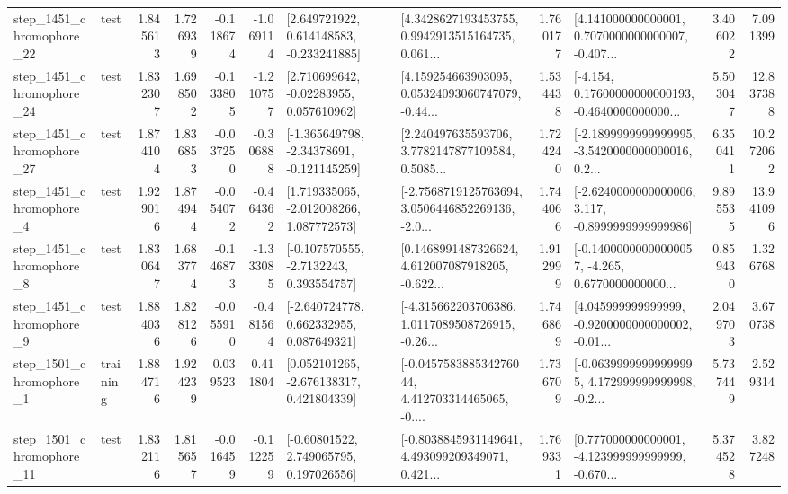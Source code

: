 \begin{tabular}{llrrrrllrlrr}
 step\_1451\_chromophore\_22 &      test &      1.845613 &    1.726939 &     -0.118674 & -1.069114 &    [2.649721922, 0.614148583, -0.233241885] &  [4.3428627193453755, 0.9942913515164735, 0.061... &       1.760177 &  [4.141000000000001, 0.7070000000000007, -0.407... &            3.406022 &          7.091399 \\
 step\_1451\_chromophore\_24 &      test &      1.832307 &    1.698502 &     -0.133805 & -1.210757 &     [2.710699642, -0.02283955, 0.057610962] &  [4.159254663903095, 0.05324093060747079, -0.44... &       1.534438 &  [-4.154, 0.17600000000000193, -0.4640000000000... &            5.503047 &         12.837388 \\
 step\_1451\_chromophore\_27 &      test &      1.874104 &    1.836853 &     -0.037250 & -0.306888 &   [-1.365649798, -2.34378691, -0.121145259] &  [2.240497635593706, 3.7782147877109584, 0.5085... &       1.724240 &  [-2.1899999999999995, -3.5420000000000016, 0.2... &            6.350411 &         10.272062 \\
  step\_1451\_chromophore\_4 &      test &      1.929016 &    1.874944 &     -0.054072 & -0.464362 &    [1.719335065, -2.012008266, 1.087772573] &  [-2.7568719125763694, 3.0506446852269136, -2.0... &       1.744066 &  [-2.6240000000000006, 3.117, -0.8999999999999986] &            9.895535 &         13.941096 \\
  step\_1451\_chromophore\_8 &      test &      1.830647 &    1.683774 &     -0.146873 & -1.333085 &     [-0.107570555, -2.7132243, 0.393554757] &  [0.1468991487326624, 4.612007087918205, -0.622... &       1.912999 &  [-0.14000000000000057, -4.265, 0.6770000000000... &            0.859430 &          1.326768 \\
  step\_1451\_chromophore\_9 &      test &      1.884036 &    1.828126 &     -0.055910 & -0.481564 &    [-2.640724778, 0.662332955, 0.087649321] &  [-4.315662203706386, 1.0117089508726915, -0.26... &       1.746869 &  [4.045999999999999, -0.9200000000000002, -0.01... &            2.049703 &          3.670738 \\
  step\_1501\_chromophore\_1 &  training &      1.884716 &    1.924239 &      0.039523 &  0.411804 &    [0.052101265, -2.676138317, 0.421804339] &  [-0.045758388534276044, 4.412703314465065, -0.... &       1.736709 &  [-0.06399999999999995, 4.172999999999998, -0.2... &            5.737449 &          2.529314 \\
 step\_1501\_chromophore\_11 &      test &      1.832116 &    1.815657 &     -0.016459 & -0.112259 &     [-0.60801522, 2.749065795, 0.197026556] &  [-0.8038845931149641, 4.493099209349071, 0.421... &       1.769331 &  [0.777000000000001, -4.123999999999999, -0.670... &            5.374528 &          3.827248 \\

\end{tabular}
